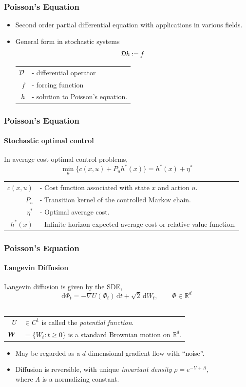 \documentclass[xcolor=dvipsnames, subsection=false]{beamer}
\def\alertb#1{\alert{\color{BrickRed}  #1}}
\def\alertb#1{\alert{\color{BrickRed}  #1}}
\def\bfmath#1{{\mathchoice{\mbox{\boldmath$#1$}}%
{\mbox{\boldmath$#1$}}%
{\mbox{\boldmath$\scriptstyle#1$}}%
{\mbox{\boldmath$\scriptscriptstyle#1$}}}}
\def\bfmW{\bfmath{W}}
\newcommand{\field}[1]{\mathbb{#1}}
\def\Re{\field{R}}
\def\eqdef{\mathbin{:=}}
\def\process{\Phi}
\def\generate{{\cal D}}
\def\ud{\text{d}}
\newcommand{\pot}{U}
\newcommand{\pr}{\rho}
\begin{document}
\begin{frame}
\frametitle{Poisson's Equation}
\begin{itemize}
	\item Second order partial differential equation with applications in various fields.
	\item General form in stochastic systems
	{\LARGE
	\[
	\generate h  \eqdef  f
	\]
    }
	
	
	\begin{tabular}{rl}
$\generate$ & - differential operator\\
$f$ & - forcing function\\
$h$ & - solution to \alertb{Poisson's equation}.
	\end{tabular}
\end{itemize}
\end{frame}



\begin{frame}
\frametitle{Poisson's Equation}
\framesubtitle{Stochastic optimal control}
 In average cost optimal control problems,
\[
\min_u \{c(x,u) + P_u h^*(x) \} = h^*(x) + \eta^*
\]
\begin{tabular}{rl}
$c(x,u)$ & - Cost function associated with state $x$ and action $u$.\\
$P_u$ & - Transition kernel of the controlled Markov chain. \\	
$\eta^*$ & - Optimal average cost.\\
$h^*(x)$ & - Infinite horizon expected average cost or \alertb{relative value function}.
\end{tabular}
\end{frame}

\begin{frame}
\frametitle{Poisson's Equation}
\framesubtitle{Langevin Diffusion}
\alertb{Langevin diffusion} is given by the SDE,
\[
\ud \process_t = - \nabla \pot(\process_t) \, \ud t
+  \sqrt{2} \, \ud W_t, \qquad \process \in \Re^d
\label{e:langevin_intro}
\]\\
\begin{tabular}{rl}
$\pot$ &  $\in C^1$ is called the \textit{potential function}. \\
$\bfmW$ &$ =\{W_t : t\ge 0\}$ is a standard Brownian motion on $\Re^d$. \pause \\[1em]
\end{tabular}
\begin{itemize}
\item May be regarded as a $d$-dimensional gradient flow with ``noise''. \pause
\item Diffusion is reversible, with unique \textit{invariant density} $\pr=e^{-\pot+\Lambda}$, \\ where $\Lambda$ is a normalizing constant.
\end{itemize}
\end{frame}
\end{document}
